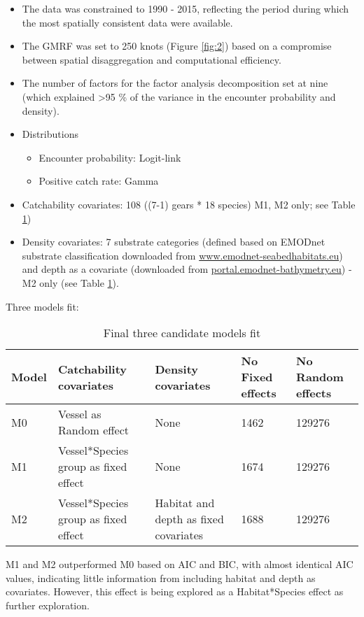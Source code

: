 \documentclass[11pt]{article}
\begin{document}
\begin{itemize}
	\item The data was constrained to 1990 - 2015, reflecting the period
		during which the most spatially consistent data were available.
	\item The GMRF was set to 250 knots (Figure \ref{fig:2}) based on a
		compromise between spatial disaggregation and computational
		efficiency.
	\item The number of factors for the factor analysis decomposition set
		at nine (which explained \textgreater 95 \% of the variance in the
		encounter probability and density).
	\item Distributions
		\begin{itemize}
			\item Encounter probability: Logit-link 
			\item Positive catch rate:   Gamma
		\end{itemize}
	\item Catchability covariates: 108 ((7-1) gears * 18 species) M1,
		M2 only; see Table \ref{tab:3})
	\item Density covariates: 7 substrate categories (defined based on
		EMODnet substrate classification downloaded from
		\url{www.emodnet-seabedhabitats.eu}) and depth as a covariate
		(downloaded from \url{portal.emodnet-bathymetry.eu}) - M2 only
		(see Table \ref{tab:3}).
\end{itemize}

Three models fit:

\begin{table}[!htb]
	\caption{Final three candidate models fit}
	\label{tab:3}
	\center
	\begin{tabular}{ p{3cm} p{4cm} p{4cm} p{2cm} p{2cm} }
		\hline
		Model & Catchability covariates & Density covariates & No Fixed
		effects & No Random effects \\
		\hline
		M0 & Vessel as Random effect & None  & 1462 & 129276 \\
		M1 & Vessel*Species group as fixed effect & None & 1674 & 129276   \\
		M2 & Vessel*Species group as fixed effect & Habitat and depth
		as fixed covariates & 1688 & 129276 \\ 
		\hline
	\end{tabular}
\end{table}

M1 and M2 outperformed M0 based on AIC and BIC, with almost identical AIC
values, indicating little information from including habitat and depth as
covariates.  However, this effect is being explored as a Habitat*Species effect
as further exploration.
\end{document}
